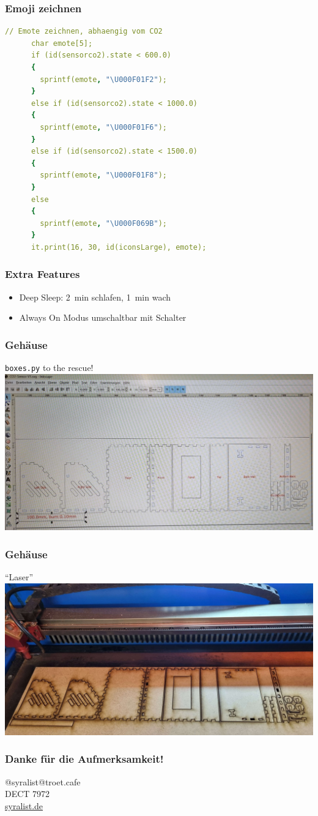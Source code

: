 \documentclass[aspectratio=169,svgnames]{beamer}
\begin{document}
\begin{frame}[fragile]
    \frametitle{Emoji zeichnen}
    \footnotesize
\begin{lstlisting}[language=yaml]
      // Emote zeichnen, abhaengig vom CO2
      char emote[5];
      if (id(sensorco2).state < 600.0)
      {
        sprintf(emote, "\U000F01F2");
      }
      else if (id(sensorco2).state < 1000.0)
      {
        sprintf(emote, "\U000F01F6");
      }
      else if (id(sensorco2).state < 1500.0)
      {
        sprintf(emote, "\U000F01F8");
      }
      else
      {
        sprintf(emote, "\U000F069B");
      }
      it.print(16, 30, id(iconsLarge), emote);
\end{lstlisting}
\end{frame}

\begin{frame}
    \frametitle{Extra Features}
    \begin{itemize}[<+->]
        \item Deep Sleep: \SI{2}{\minute} schlafen, \SI{1}{\minute} wach
        \item Always On Modus umschaltbar mit Schalter
    \end{itemize}
\end{frame}

\begin{frame}
    \frametitle{Gehäuse}
    \texttt{boxes.py} to the rescue!\\
    \includegraphics[height=0.8\textheight]{boxes-py-02.jpg}
\end{frame}

\begin{frame}
    \frametitle{Gehäuse}
    \enquote{Laser}\\
    \includegraphics[height=0.8\textheight]{laser-02.jpg}
\end{frame}

\begin{frame}
    \frametitle{Danke für die Aufmerksamkeit!}
    @syralist@troet.cafe\\
    DECT 7972\\
    \href{https:\\syralist.de}{syralist.de}
\end{frame}
\end{document}
